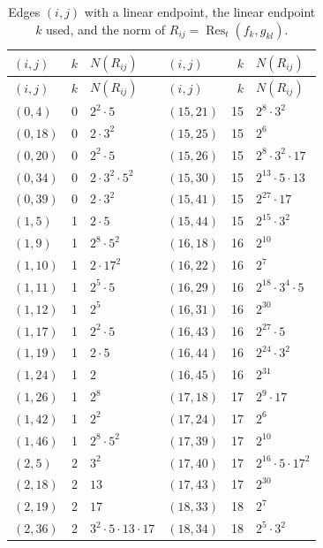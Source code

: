 \documentclass[11pt]{article}
\begin{document}
\begingroup\small
\setlength{\LTcapwidth}{\textwidth}
\begin{longtable}{@{}lrl@{\qquad}lrl@{}}
\caption{Edges $(i,j)$ with a linear endpoint, the linear endpoint $k$ used, and the norm of $R_{ij}=\operatorname{Res}_t(f_k,g_{kl})$.}\label{tab:sep}\\
\hline $(i,j)$ & $k$ & $N(R_{ij})$ & $(i,j)$ & $k$ & $N(R_{ij})$\\\hline\endfirsthead\hline $(i,j)$ & $k$ & $N(R_{ij})$ & $(i,j)$ & $k$ & $N(R_{ij})$\\\hline\endhead\hline\endfoot
$(0,4)$ & 0 & $2^{2}\cdot 5$ & $(15,21)$ & 15 & $2^{8}\cdot 3^{2}$\\
$(0,18)$ & 0 & $2\cdot 3^{2}$ & $(15,25)$ & 15 & $2^{6}$\\
$(0,20)$ & 0 & $2^{2}\cdot 5$ & $(15,26)$ & 15 & $2^{8}\cdot 3^{2}\cdot 17$\\
$(0,34)$ & 0 & $2\cdot 3^{2}\cdot 5^{2}$ & $(15,30)$ & 15 & $2^{13}\cdot 5\cdot 13$\\
$(0,39)$ & 0 & $2\cdot 3^{2}$ & $(15,41)$ & 15 & $2^{27}\cdot 17$\\
$(1,5)$ & 1 & $2\cdot 5$ & $(15,44)$ & 15 & $2^{15}\cdot 3^{2}$\\
$(1,9)$ & 1 & $2^{8}\cdot 5^{2}$ & $(16,18)$ & 16 & $2^{10}$\\
$(1,10)$ & 1 & $2\cdot 17^{2}$ & $(16,22)$ & 16 & $2^{7}$\\
$(1,11)$ & 1 & $2^{5}\cdot 5$ & $(16,29)$ & 16 & $2^{18}\cdot 3^{4}\cdot 5$\\
$(1,12)$ & 1 & $2^{5}$ & $(16,31)$ & 16 & $2^{30}$\\
$(1,17)$ & 1 & $2^{2}\cdot 5$ & $(16,43)$ & 16 & $2^{27}\cdot 5$\\
$(1,19)$ & 1 & $2\cdot 5$ & $(16,44)$ & 16 & $2^{24}\cdot 3^{2}$\\
$(1,24)$ & 1 & $2$ & $(16,45)$ & 16 & $2^{31}$\\
$(1,26)$ & 1 & $2^{8}$ & $(17,18)$ & 17 & $2^{9}\cdot 17$\\
$(1,42)$ & 1 & $2^{2}$ & $(17,24)$ & 17 & $2^{6}$\\
$(1,46)$ & 1 & $2^{8}\cdot 5^{2}$ & $(17,39)$ & 17 & $2^{10}$\\
$(2,5)$ & 2 & $3^{2}$ & $(17,40)$ & 17 & $2^{16}\cdot 5\cdot 17^{2}$\\
$(2,18)$ & 2 & $13$ & $(17,43)$ & 17 & $2^{30}$\\
$(2,19)$ & 2 & $17$ & $(18,33)$ & 18 & $2^{7}$\\
$(2,36)$ & 2 & $3^{2}\cdot 5\cdot 13\cdot 17$ & $(18,34)$ & 18 & $2^{5}\cdot 3^{2}$\\

\end{longtable}
\end{document}
